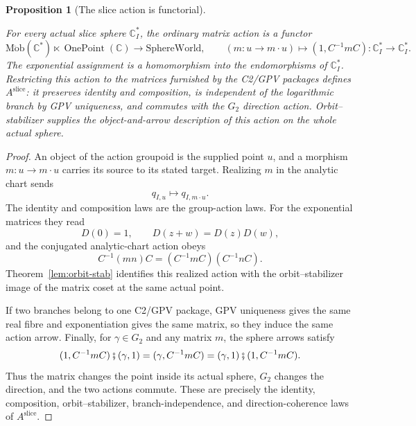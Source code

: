 \documentclass[11pt]{article}
\newcommand{\CC}{\mathbb{C}}
\providecommand{\SphereWorld}{\mathrm{SphereWorld}}
\providecommand{\lean}[1]{}
\providecommand{\uses}[1]{}
\theoremstyle{plain}
\newtheorem{proposition}[theorem]{Proposition}
\theoremstyle{definition}
\theoremstyle{remark}
\begin{document}
\begin{proposition}[The slice action is functorial]\label{prop:aslice-functor}
\lean{ASection.sliceMatrixAction,
ASection.sliceMatrixAction_realize,
ASection.sliceMatrixActionArrow_realize_eq_orbitStabilizer,
ASection.sliceExponentialEnd,
ASection.sliceExponentialEnd_add,
ASection.sliceExponentialEnd_comp,
ASection.C2GpvPackage.branch_sliceActionHom_eq,
ASection.C2GpvPackage.sliceActionHom_comp,
ASection.C2GpvPackage.sliceActionHom_natural_dir}
\uses{def:aslice, lem:disk-homomorphism, lem:orbit-stab}
For every actual slice sphere $\CC_I^{*}$, the ordinary matrix action is a
functor
\[
 \operatorname{M\ddot ob}(\CC^{*})\ltimes\operatorname{OnePoint}(\CC)
   \longrightarrow\SphereWorld,
 \qquad
 (m:u\to m\cdot u)\longmapsto
 (1,C^{-1}mC):\CC_I^{*}\to\CC_I^{*}.
                                                        \tag{Act}\label{eq:slice-action-functor}
\]
The exponential assignment is a homomorphism into the endomorphisms of
$\CC_I^{*}$. Restricting this action to the matrices furnished by the
C2/GPV packages defines $A^{\mathrm{slice}}$: it preserves identity and
composition, is independent of the logarithmic branch by GPV uniqueness,
and commutes with the $G_2$ direction action. Orbit--stabilizer supplies the
object-and-arrow description of this action on the whole actual sphere.
\end{proposition}

\begin{proof}
An object of the action groupoid is the supplied point $u$, and a morphism
$m:u\to m\cdot u$ carries its source to its stated target. Realizing $m$ in
the analytic chart sends
\[
 q_{I,u}\longmapsto q_{I,m\cdot u}.
\]
The identity and composition laws are the group-action laws. For the
exponential matrices they read
\[
 D(0)=1,\qquad D(z+w)=D(z)D(w),
\]
and the conjugated analytic-chart action obeys
\[
 C^{-1}(mn)C=(C^{-1}mC)(C^{-1}nC).
\]
Theorem~\ref{lem:orbit-stab} identifies this realized action with the
orbit--stabilizer image of the matrix coset at the same actual point.

If two branches belong to one C2/GPV package, GPV uniqueness gives the same
real fibre and exponentiation gives the same matrix, so they induce the same
action arrow. Finally, for $\gamma\in G_2$ and any matrix $m$, the sphere
arrows satisfy
\[
 (1,C^{-1}mC)\fatsemi(\gamma,1)
   =(\gamma,C^{-1}mC)
   =(\gamma,1)\fatsemi(1,C^{-1}mC).
\]
Thus the matrix changes the point inside its actual sphere, $G_2$ changes
the direction, and the two actions commute. These are precisely the
identity, composition, orbit--stabilizer, branch-independence, and
direction-coherence laws of $A^{\mathrm{slice}}$.
\end{proof}
\end{document}
